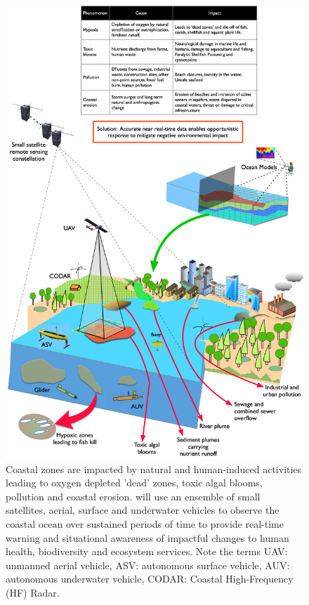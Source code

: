 \documentclass[12pt]{article}
\begin{document}
\begin{figure}[H]
  \centering
  \includegraphics[scale=0.115]{fig/mega-cities-toxic-1.jpg}
  \caption{Coastal zones are impacted by natural and human-induced
    activities leading to oxygen depleted 'dead' zones, toxic algal
    blooms, pollution and coastal erosion. \pro will use an ensemble
    of small satellites, aerial, surface and underwater vehicles to
    observe the coastal ocean over sustained periods of time to
    provide real-time warning and situational awareness of impactful
    changes to human health, biodiversity and ecosystem services. Note
    the terms UAV: unmanned aerial vehicle, ASV: autonomous surface
    vehicle, AUV: autonomous underwater vehicle, CODAR: Coastal
    High-Frequency (HF) Radar.}
    \label{fig:mega-cities}
\end{figure}
\end{document}
